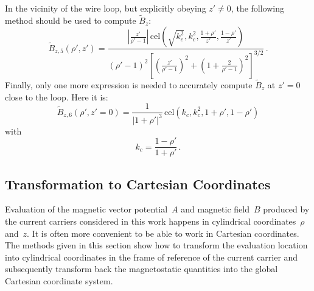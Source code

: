 In the vicinity of the wire loop, but explicitly obeying $z' \neq 0$,
the following method should be used to compute $\tilde{B}_z$:
\begin{equation}
  \tilde{B}_{z,5} (\rho', z')
  = \frac{\left| \frac{z'}{\rho' - 1} \right| \,\mathrm{cel}\left( \sqrt{k_c^2}, k_c^2, \frac{1 + \rho'}{z'}, \frac{1 - \rho'}{z'} \right) }
         {\left(\rho' - 1 \right)^2 \left[ \left( \frac{z'}{\rho'-1} \right)^2 + \left(1 + \frac{2}{\rho'-1} \right)^2 \right]^{3/2} } \, .
\end{equation}
Finally, only one more expression is needed to accurately compute $\tilde{B}_z$ at $z'=0$ close to the loop.
Here it is:
\begin{equation}
  \tilde{B}_{z,6} (\rho', z'=0)
  = \frac{1}{|1 + \rho'|^3}
    \,\mathrm{cel}(k_c, k_c^2, 1+\rho', 1-\rho')
\end{equation}
with
\begin{equation}
  k_c = \frac{1-\rho'}{1+\rho'} \, .
\end{equation}
%
%






\subsection{Transformation to Cartesian Coordinates}
Evaluation of the magnetic vector potential~$A$ and magnetic field~$B$
produced by the current carriers considered in this work
happens in cylindrical coordinates~$\rho$ and~$z$.
It is often more convenient to be able to work in Cartesian coordinates.
The methods given in this section show how to transform the evaluation location
into cylindrical coordinates in the frame of reference of the current carrier
and subsequently transform back the magnetostatic quantities into the global Cartesian coordinate system.

